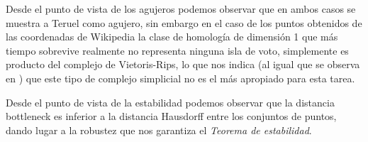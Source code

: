 Desde el punto de vista de los agujeros podemos observar que en ambos casos se muestra a Teruel como agujero, sin embargo en el caso de los puntos obtenidos de las coordenadas de Wikipedia la clase de homología de dimensión 1 que más tiempo sobrevive realmente no representa ninguna isla de voto, simplemente es producto del complejo de Vietoris-Rips, lo que nos indica (al igual que se observa en \cite{votosArticulo}) que este tipo de complejo simplicial no es el más apropiado para esta tarea.

Desde el punto de vista de la estabilidad podemos observar que la distancia bottleneck es inferior a la distancia Hausdorff entre los conjuntos de puntos, dando lugar a la robustez que nos garantiza el \emph{Teorema de estabilidad}.

\begin{minipage}{\linewidth}
\end{minipage}